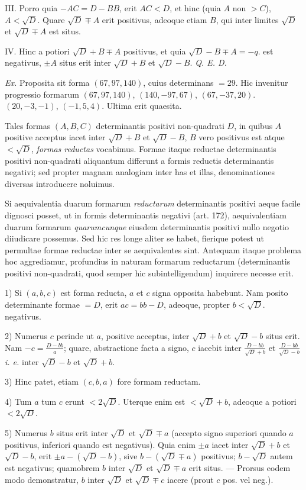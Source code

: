 III. Porro quia $-AC=D-BB$, erit $AC<D$, et hinc (quia $A$ non $>C$), $A<\surd D$. Quare $\surd D\mp A$ erit positivus, adeoque etiam $B$, qui inter limites $\surd D$ et $\surd D\mp A$ est situs.

IV. Hinc a potiori $\surd D+B\mp A$ positivus, et quia $\surd D-B\mp A=-q$. est negativus, $\pm A$ situs erit inter $\surd D+B$ et $\surd D-B$. \textit{Q. E. D.}

\textit{Ex.} Proposita sit forma $(67,97,140)$, cuius determinans $=29$. Hic invenitur progressio formarum $(67,97,140)$, $(140,-97,67)$, $(67,-37,20)$. $(20,-3,-1)$, $(-1,5,4)$. Ultima erit quaesita.

Tales formas $(A,B,C)$ determinantis positivi non-quadrati $D$, in quibus $A$ positive acceptus iacet inter $\surd D+B$ et $\surd D-B$, $B$ vero positivus est atque $<\surd D$, \textit{formas reductas} vocabimus. Formae itaque reductae determinantis positivi non-quadrati aliquantum differunt a formis reductis determinantis negativi; sed propter magnam analogiam inter has et illas, denominationes diversas introducere noluimus.

Si aequivalentia duarum formarum \textit{reductarum} determinantis positivi aeque facile dignosci posset, ut in formis determinantis negativi (art. 172), aequivalentiam duarum formarum \textit{quarumcunque} eiusdem determinantis positivi nullo negotio diiudicare possemus. Sed hic res longe aliter se habet, fierique potest ut permultae formae reductae inter se aequivalentes sint. Antequam itaque problema hoc aggrediamur, profundius in naturam formarum reductarum (determinantis positivi non-quadrati, quod semper hic subintelligendum) inquirere necesse erit.

1) Si $(a,b,c)$ est forma reducta, $a$ et $c$ signa opposita habebunt. Nam posito determinante formae $=D$, erit $ac=bb-D$, adeoque, propter $b<\surd D$. negativus.

2) Numerus $c$ perinde ut $a$, positive acceptus, inter $\surd D+b$ et $\surd D-b$ situs erit. Nam $-c=\frac{D-bb}{a}$; quare, abstractione facta a signo, $c$ iacebit inter $\frac{D-bb}{\surd D+b}$ et $\frac{D-bb}{\surd D-b}$ \textit{i. e.} inter $\surd D-b$ et $\surd D+b$.

3) Hinc patet, etiam $(c,b,a)$ fore formam reductam.

4) Tum $a$ tum $c$ erunt $<2\surd D$. Uterque enim est $<\surd D+b$, adeoque a potiori $<2\surd D$.

5) Numerus $b$ situs erit inter $\surd D$ et $\surd D\mp a$ (accepto signo superiori quando $a$ positivus, inferiori quando est negativus). Quia enim $\pm a$ iacet inter $\surd D+b$ et $\surd D-b$, erit $\pm a-(\surd D-b)$, sive $b-(\surd D\mp a)$ positivus; $b-\surd D$ autem est negativus; quamobrem $b$ inter $\surd D$ et $\surd D\mp a$ erit situs. --- Prorsus eodem modo demonstratur, $b$ inter $\surd D$ et $\surd D\mp c$ iacere (prout $c$ pos. vel neg.).

